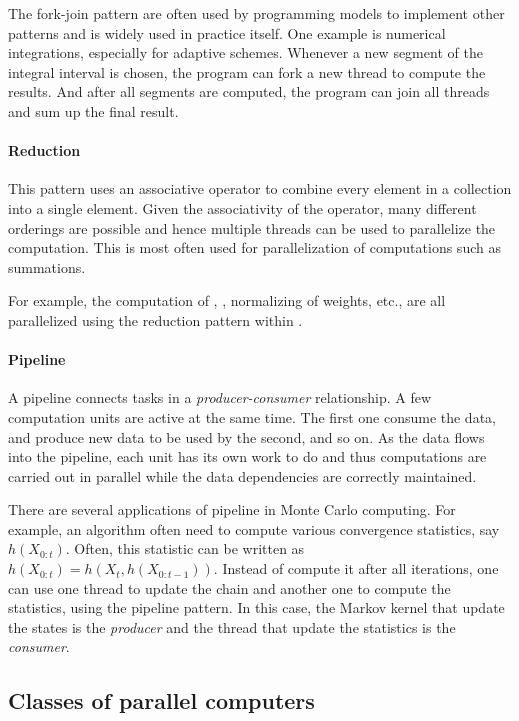 The fork-join pattern are often used by programming models to implement other
patterns and is widely used in practice itself. One example is numerical
integrations, especially for adaptive schemes. Whenever a new segment of the
integral interval is chosen, the program can fork a new thread to compute the
results. And after all segments are computed, the program can join all threads
and sum up the final result.

\paragraph{Reduction}

This pattern uses an associative operator to combine every element in a
collection into a single element. Given the associativity of the operator,
many different orderings are possible and hence multiple threads can be used
to parallelize the computation. This is most often used for parallelization of
computations such as summations.

For example, the computation of \ess, \cess, normalizing of weights, etc., are
all parallelized using the reduction pattern within \vsmc.

\paragraph{Pipeline}

A pipeline connects tasks in a \emph{producer-consumer} relationship. A few
computation units are active at the same time. The first one consume the data,
and produce new data to be used by the second, and so on. As the data flows
into the pipeline, each unit has its own work to do and thus computations are
carried out in parallel while the data dependencies are correctly maintained.

There are several applications of pipeline in Monte Carlo computing. For
example, an \mcmc algorithm often need to compute various convergence
statistics, say $h(X_{0:t})$. Often, this statistic can be written as
$h(X_{0:t}) = h(X_t, h(X_{0:{t-1}}))$. Instead of compute it after all
iterations, one can use one thread to update the \mcmc chain and another one
to compute the statistics, using the pipeline pattern. In this case, the
Markov kernel that update the states is the \emph{producer} and the thread
that update the statistics is the \emph{consumer}.

\subsection{Classes of parallel computers}
\label{sub:Classes of parallel computers}

